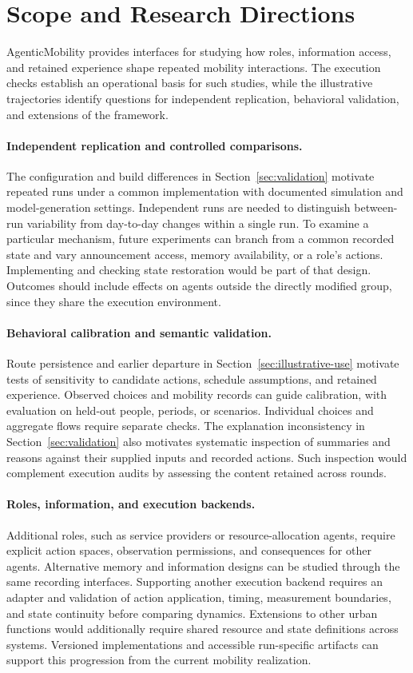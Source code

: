 \section{Scope and Research Directions}
\label{sec:scope}

AgenticMobility provides interfaces for studying how roles, information access, and retained experience shape repeated mobility interactions. The execution checks establish an operational basis for such studies, while the illustrative trajectories identify questions for independent replication, behavioral validation, and extensions of the framework.

\paragraph{Independent replication and controlled comparisons.}
The configuration and build differences in Section~\ref{sec:validation} motivate repeated runs under a common implementation with documented simulation and model-generation settings. Independent runs are needed to distinguish between-run
variability from day-to-day changes within a single run. To examine a particular mechanism, future experiments can branch from a common recorded state and vary announcement access, memory availability, or a role's actions. Implementing and checking state restoration would be part of that design. Outcomes should include effects on agents outside the directly modified group, since they share the execution environment.

\paragraph{Behavioral calibration and semantic validation.}
Route persistence and earlier departure in Section~\ref{sec:illustrative-use} motivate tests of sensitivity to candidate actions, schedule assumptions, and retained experience. Observed choices and mobility records can guide calibration, with evaluation on held-out people, periods, or scenarios. Individual choices and aggregate flows require separate checks. The explanation inconsistency in Section~\ref{sec:validation} also motivates systematic inspection of summaries and reasons against their supplied inputs and recorded actions. Such inspection would complement execution audits by assessing the content retained across rounds.

\paragraph{Roles, information, and execution backends.}
Additional roles, such as service providers or resource-allocation agents, require explicit action spaces, observation permissions, and consequences for other agents. Alternative memory and information designs can be studied through the same recording interfaces. Supporting another execution backend requires an adapter and validation of action application, timing, measurement boundaries, and state continuity before comparing dynamics. Extensions to other urban functions would additionally require shared resource and state definitions across systems. Versioned implementations and accessible run-specific artifacts can support this progression from the current mobility realization.
